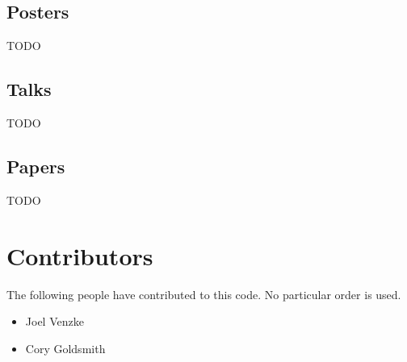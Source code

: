 \documentclass{article}
\begin{document}
\subsection{Posters} %
\label{sub:posters}
TODO
\subsection{Talks} %
\label{sub:talks}
TODO
\subsection{Papers} %
\label{sub:papers}
TODO
\section{Contributors} %
\label{sec:contributors}
The following people have contributed to this code. No particular order is used.
\begin{itemize}
  \item Joel Venzke
  \item Cory Goldsmith
\end{itemize}
\end{document}
